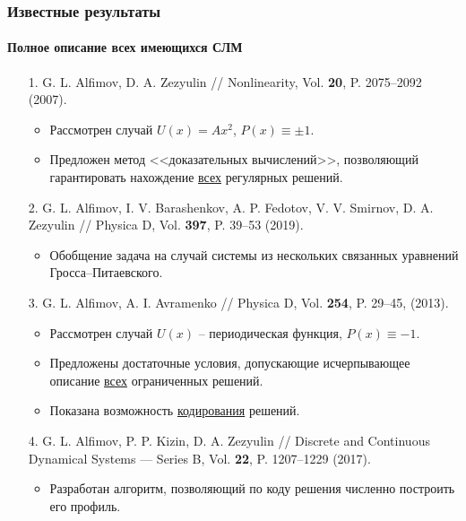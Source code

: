 \documentclass [10pt] {beamer}
\begin{document}
\begin{frame}
	\frametitle{Известные результаты}
	\framesubtitle{Полное описание всех имеющихся СЛМ}
	
	\begin{small}
	\begin{enumerate}
		\setlength\itemsep{5pt}
		\item[1.] G. L. Alfimov, D. A. Zezyulin // Nonlinearity, Vol. {\bf 20}, P. 2075--2092 (2007).
			\begin{itemize}
				\item Рассмотрен случай $U(x) = Ax^2$, $P(x) \equiv \pm 1$.
				\item Предложен метод <<доказательных вычислений>>, позволяющий гарантировать нахождение \underline{всех} регулярных решений.
			\end{itemize}
		\item[2.] G. L. Alfimov, I. V. Barashenkov, A. P. Fedotov, V. V. Smirnov, D. A. Zezyulin // Physica D, Vol. {\bf 397}, P. 39--53 (2019).
			\begin{itemize}
				\item Обобщение задача на случай системы из нескольких связанных уравнений Гросса--Питаевского.
			\end{itemize}
		\item[3.] G. L. Alfimov, A. I. Avramenko // Physica D, Vol. {\bf 254}, P. 29--45, (2013).
			\begin{itemize}
				\item Рассмотрен случай $U(x)$ -- периодическая функция, $P(x) \equiv -1$.
				\item Предложены достаточные условия, допускающие исчерпывающее описание \underline{всех} ограниченных решений.
				\item Показана возможность \underline{кодирования} решений.
			\end{itemize}
		\item[4.] G. L. Alfimov, P. P. Kizin, D. A. Zezyulin // Discrete and Continuous Dynamical Systems --- Series B, Vol. {\bf 22}, P. 1207--1229 (2017).
			\begin{itemize}
				\item Разработан алгоритм, позволяющий по коду решения численно построить его профиль.
			\end{itemize}
	\end{enumerate}
	\end{small}
\end{frame}
\end{document}
